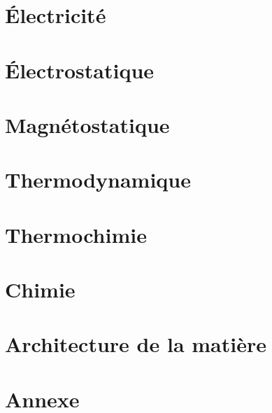 \documentclass[a4paper, titlepage, draft,twoside]{book}
\begin{document}
\part{\'Electricit\'e}
\setcounter{chapter}{0}
\part{\'Electrostatique}
\setcounter{chapter}{0}
\part{Magn\'etostatique}
\setcounter{chapter}{0}
\part{Thermodynamique}
\setcounter{chapter}{0}
\part{Thermochimie}
\setcounter{chapter}{0}
\part{Chimie}
\setcounter{chapter}{0}
\part{Architecture de la matière}
 \setcounter{chapter}{0}

\appendix                     %
\part{Annexe}



\backmatter
\tableofcontents            %
\end{document}
